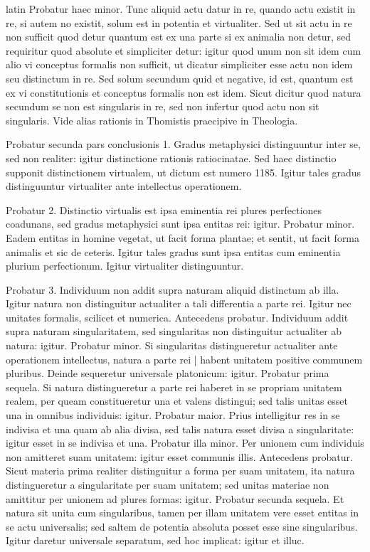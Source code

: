 \begin{otherlanguage*}{latin}
\pstart
Probatur haec minor. Tunc aliquid actu datur in re, quando actu existit in re, si autem no existit, solum est in potentia et virtualiter. Sed ut sit actu in re non sufficit quod detur quantum est ex una parte si ex animalia non detur, sed requiritur quod absolute et simpliciter detur:
igitur quod unum non sit idem cum alio vi conceptus formalis non sufficit, ut dicatur simpliciter esse actu non idem seu distinctum in re. Sed solum secundum quid et negative, id est, quantum est ex vi constitutionis et conceptus formalis non est idem. Sicut dicitur quod natura secundum se non est singularis in re, sed non infertur quod actu non sit singularis. Vide alias rationis in Thomistis praecipive in Theologia. 
\pend

\pstart
Probatur secunda pars conclusionis 1. Gradus metaphysici distinguuntur inter se, sed non realiter:
igitur distinctione rationis ratiocinatae. Sed haec distinctio supponit distinctionem virtualem, ut dictum est numero 1185. Igitur tales gradus distinguuntur virtualiter ante intellectus operationem. 
\pend

\pstart
Probatur 2. Distinctio virtualis est ipsa eminentia rei plures perfectiones coadunans, sed gradus metaphysici sunt ipsa entitas rei:
igitur. Probatur minor. Eadem entitas in homine vegetat, ut facit forma plantae; et sentit, ut facit forma animalis et sic de ceteris. Igitur tales gradus sunt ipsa entitas cum eminentia plurium perfectionum. Igitur virtualiter distinguuntur. 
\pend

\pstart
Probatur 3. Individuum non addit supra naturam aliquid distinctum ab illa. Igitur natura non distinguitur actualiter a tali differentia a parte rei. Igitur nec unitates formalis, scilicet et numerica. Antecedens probatur. Individuum addit supra naturam singularitatem, sed singularitas non distinguitur actualiter ab natura:
igitur. Probatur minor. Si singularitas distingueretur actualiter ante operationem intellectus, natura a parte rei \textnormal{|} habent unitatem positive communem pluribus. Deinde sequeretur universale platonicum:
igitur. Probatur prima sequela. Si natura distingueretur a parte rei haberet in se propriam unitatem realem, per queam constitueretur una et valens distingui; sed talis unitas esset una in omnibus individuis:
igitur. Probatur maior. Prius intelligitur res in se indivisa et una quam ab alia divisa, sed talis natura esset divisa a singularitate:
igitur esset in se indivisa et una. Probatur illa minor. Per unionem cum individuis non amitteret suam unitatem:
igitur esset communis illis. Antecedens probatur. Sicut materia prima realiter distinguitur a forma per suam unitatem, ita natura distingueretur a singularitate per suam unitatem; sed unitas materiae non amittitur per unionem ad plures formas:
igitur. Probatur secunda sequela. Et natura sit unita cum singularibus, tamen per illam unitatem vere esset entitas in se actu universalis; sed saltem de potentia absoluta posset esse sine singularibus. Igitur daretur universale separatum, sed hoc implicat:
igitur et illuc. 
\pend


\end{otherlanguage*}
